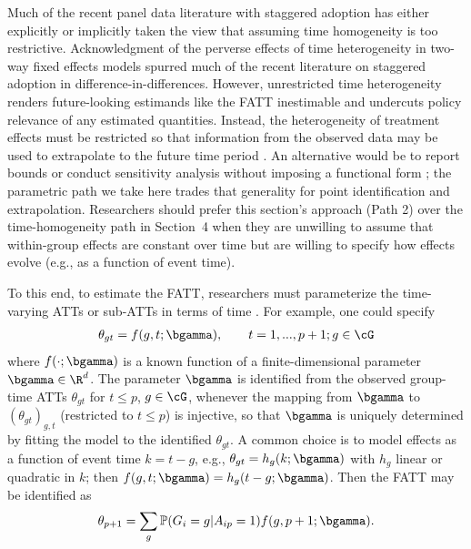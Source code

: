 \documentclass{article}
\renewcommand{\P}{\mathbb{P}}
\begin{document}
Much of the recent panel data literature with staggered adoption has either explicitly \citep{sunEstimatingDynamicTreatment2021,wangAdvancesDifferenceindifferencesMethods2024a,brownDynamicTreatmentEffect2025} or implicitly \citep{stockIdentificationEstimationDynamic2018} taken the view that assuming time homogeneity is too restrictive. Acknowledgment of the perverse effects of time heterogeneity in two-way fixed effects models \citep{sunEstimatingDynamicTreatment2021,wangAdvancesDifferenceindifferencesMethods2024a} spurred much of the recent literature on staggered adoption in difference-in-differences. However, unrestricted time heterogeneity renders future-looking estimands like the FATT inestimable and undercuts policy relevance of any estimated quantities. Instead, the heterogeneity of treatment effects must be restricted so that information from the observed data may be used to extrapolate to the future time period \citep{khosrowiExtrapolationCausalEffects2019,khosrowiExtrapolatingExperimentsConfidently2023,maebaExtrapolationTreatmentEffect2024}. An alternative would be to report bounds or conduct sensitivity analysis without imposing a functional form \citep{manskiPublicPolicyUncertain2013}; the parametric path we take here trades that generality for point identification and extrapolation. Researchers should prefer this section's approach (Path 2) over the time-homogeneity path in Section~4 when they are unwilling to assume that within-group effects are constant over time but are willing to specify how effects evolve (e.g., as a function of event time).

To this end, to estimate the FATT, researchers must parameterize the time-varying ATTs or sub-ATTs in terms of time \citep{brownDynamicTreatmentEffect2025,maebaExtrapolationTreatmentEffect2024}. For example, one could specify
\begin{align*}
    \theta_{gt} = f(g, t; \bgamma), \qquad t = 1, ..., p+1; g \in \cG
\end{align*}
where $f(\cdot ; \bgamma)$ is a known function of a finite-dimensional parameter $\bgamma \in \R^d$. The parameter $\bgamma$ is identified from the observed group-time ATTs $\theta_{gt}$ for $t \leq p$, $g \in \cG$, whenever the mapping from $\bgamma$ to $(\theta_{gt})_{g,t}$ (restricted to $t \leq p$) is injective, so that $\bgamma$ is uniquely determined by fitting the model to the identified $\theta_{gt}$. A common choice is to model effects as a function of event time $k = t - g$, e.g., $\theta_{gt} = h_g(k; \bgamma)$ with $h_g$ linear or quadratic in $k$; then $f(g,t;\bgamma) = h_g(t-g;\bgamma)$. Then the FATT may be identified as
\begin{align*}
    \theta_{p+1} = \sum_{g}\P(G_i = g | A_{ip} = 1) f(g, p+1; \bgamma).
\end{align*}
\end{document}
